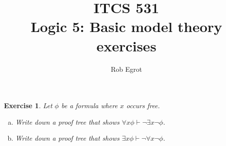 \documentclass{article}
\title{ITCS 531 \\Logic 5: Basic model theory exercises}
\author{Rob Egrot}
\date{}
\theoremstyle{plain}
\newtheorem{Q}[theorem]{Exercise}{\bfseries}{\upshape}
\begin{document}
\maketitle
\begin{Q}
Let $\phi$ be a formula where $x$ occurs free.
\begin{enumerate}[a)]
\item Write down a proof tree that shows $\forall x \phi \vdash \neg\exists x \neg\phi$. 
\item Write down a proof tree that shows $\exists x \phi \vdash \neg\forall x \neg \phi$.
\end{enumerate}
\end{Q}
\begin{comment}
\textbf{Solution:}
\begin{enumerate}[a)]
\item\begin{prooftree}
\AxiomC{$[\exists x\neg\phi]_1$}
\AxiomC{$[\neg\phi[x'/x]]_2$}
\AxiomC{$\forall x\phi$}
\RightLabel{ $\color{red}(\forall_E)$}
\UnaryInfC{$\phi[x'/x]$}
\RightLabel{ $\color{red}(\neg_E)$}
\BinaryInfC{$\bot$}
\RightLabel{ $\color{red}(\exists_E)$}
\BinaryInfC{$\bot$}
\RightLabel{ $\color{red}(\neg_I)$}
\UnaryInfC{$\neg\exists x \neg\phi$}
\end{prooftree}

\item \begin{prooftree}
\AxiomC{$\exists x \phi$}
\AxiomC{$[\forall x\neg\phi]_1$}
\LeftLabel{ $\color{red}(\forall_E)$}
\UnaryInfC{$\neg\phi[x'/x]$}
\AxiomC{$[\phi[x'/x]]_2$}
\RightLabel{ $\color{red}(\neg_E)$}
\BinaryInfC{$\bot$}
\RightLabel{ $\color{red}(\exists_E)$}
\BinaryInfC{$\bot$}
\RightLabel{ $\color{red}(\neg_I)$}
\UnaryInfC{$\neg\forall x \neg\phi$}
\end{prooftree}
\end{enumerate}
\end{comment}
\end{document}
